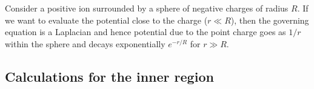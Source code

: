 \documentclass[11pt,a4paper]{article}
\newcommand{\1}{\vect{1}}
\begin{document}
Consider a positive ion surrounded by a sphere of negative charges of radius $R$. If we want to evaluate the potential close to the charge ($r \ll R$), then the governing equation is a Laplacian and hence potential due to the point charge goes as $1/r$ within the sphere and decays exponentially $e^{-r/R}$ for $r \gg R$.




\subsection{Calculations for the inner region}
\end{document}
